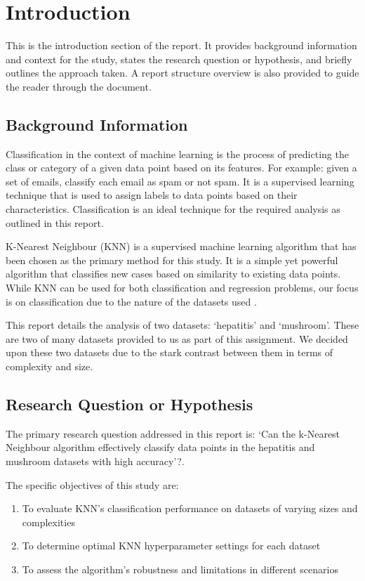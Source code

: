 \section{Introduction}
\label{sec:introduction}

This is the introduction section of the report. It provides background information and context for the study, states the research question or hypothesis, and briefly outlines the approach taken.
A report structure overview is also provided to guide the reader through the document.

\subsection{Background Information}

Classification in the context of machine learning is the process of predicting the class or category of a given data point based on its features.
For example: given a set of emails, classify each email as spam or not spam. 
It is a supervised learning technique that is used to assign labels to data points based on their characteristics.
Classification is an ideal technique for the required analysis as outlined in this report.\par

K-Nearest Neighbour (KNN) is a supervised machine learning algorithm that has been chosen as the primary method for this study.
It is a simple yet powerful algorithm that classifies new cases based on similarity to existing data points.
While KNN can be used for both classification and regression problems, our focus is on classification due to 
the nature of the datasets used \cite{knn}.\par

This report details the analysis of two datasets: `hepatitis' and `mushroom'. These are two of many datasets provided to us as part of this assignment.
We decided upon these two datasets due to the stark contrast between them in terms of complexity and size.

\subsection{Research Question or Hypothesis}
The primary research question addressed in this report is: `Can the k-Nearest Neighbour algorithm effectively classify
data points in the hepatitis and mushroom datasets with high accuracy'?.\par

The specific objectives of this study are:
\begin{enumerate}
    \item To evaluate KNN's classification performance on datasets of varying sizes and complexities
    \item To determine optimal KNN hyperparameter settings for each dataset
    \item To assess the algorithm's robustness and limitations in different scenarios
\end{enumerate}

